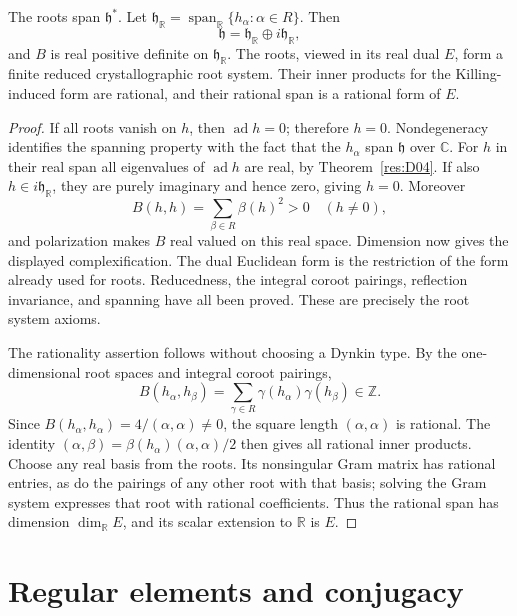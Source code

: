 \begin{proposition}\label{res:D05}
The roots span \(\mathfrak h^*\). Let
\(\mathfrak h_{\mathbb R}=\operatorname{span}_{\mathbb R}
\{h_\alpha:\alpha\in R\}\). Then
\[
 \mathfrak h=\mathfrak h_{\mathbb R}\oplus
 i\mathfrak h_{\mathbb R},
\]
and \(B\) is real positive definite on \(\mathfrak h_{\mathbb R}\).
The roots, viewed in its real dual \(E\), form a finite reduced
crystallographic root system. Their inner products for the
Killing-induced form are rational, and their rational span is
a rational form of \(E\).
\end{proposition}
\begin{proof}
If all roots vanish on \(h\), then \(\operatorname{ad}h=0\);
therefore \(h=0\). Nondegeneracy identifies the spanning property
with the fact that the \(h_\alpha\) span \(\mathfrak h\) over
\(\mathbb C\).
For \(h\) in their real span all eigenvalues of \(\operatorname{ad}h\)
are real, by Theorem~\ref{res:D04}. If also \(h\in
i\mathfrak h_{\mathbb R}\), they are purely imaginary and hence
zero, giving \(h=0\). Moreover
\[
 B(h,h)=\sum_{\beta\in R}\beta(h)^2>0\quad(h\ne0),
\]
and polarization makes \(B\) real valued on this real space.
Dimension now gives the displayed complexification.
The dual Euclidean form is the restriction of the form already
used for roots. Reducedness, the integral coroot pairings,
reflection invariance, and spanning have all been proved.
These are precisely the root system axioms.

The rationality assertion follows without choosing a Dynkin type.
By the one-dimensional root spaces and integral coroot pairings,
\[
 B(h_\alpha,h_\beta)
     =\sum_{\gamma\in R}\gamma(h_\alpha)\gamma(h_\beta)
       \in\mathbb Z.
\]
Since \(B(h_\alpha,h_\alpha)=4/(\alpha,\alpha)\ne0\),
the square length \((\alpha,\alpha)\) is rational. The identity
\((\alpha,\beta)=\beta(h_\alpha)(\alpha,\alpha)/2\)
then gives all rational inner products. Choose any real basis
from the roots. Its nonsingular Gram matrix has rational entries,
as do the pairings of any other root with that basis; solving
the Gram system expresses that root with rational coefficients.
Thus the rational span has dimension \(\dim_{\mathbb R}E\),
and its scalar extension to \(\mathbb R\) is \(E\).
\end{proof}

\section{Regular elements and conjugacy}

